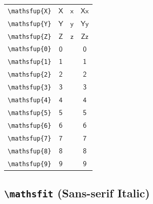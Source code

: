 \documentclass[12pt,a4paper]{article}
\begin{document}
\begin{longtable}{|c|c|c|c|}
\verb|\mathsfup{X}| & $\mathsfup{X}$ & $\mathsfup{x}$ & $ 𝖷 𝗑 $ \\
\verb|\mathsfup{Y}| & $\mathsfup{Y}$ & $\mathsfup{y}$ & $ 𝖸 𝗒 $ \\
\verb|\mathsfup{Z}| & $\mathsfup{Z}$ & $\mathsfup{z}$ & $ 𝖹 𝗓 $ \\
\verb|\mathsfup{0}| & $\mathsfup{0}$ & & $ 𝟢 $ \\
\verb|\mathsfup{1}| & $\mathsfup{1}$ & & $ 𝟣 $ \\
\verb|\mathsfup{2}| & $\mathsfup{2}$ & & $ 𝟤 $ \\
\verb|\mathsfup{3}| & $\mathsfup{3}$ & & $ 𝟥 $ \\
\verb|\mathsfup{4}| & $\mathsfup{4}$ & & $ 𝟦 $ \\
\verb|\mathsfup{5}| & $\mathsfup{5}$ & & $ 𝟧 $ \\
\verb|\mathsfup{6}| & $\mathsfup{6}$ & & $ 𝟨 $ \\
\verb|\mathsfup{7}| & $\mathsfup{7}$ & & $ 𝟩 $ \\
\verb|\mathsfup{8}| & $\mathsfup{8}$ & & $ 𝟪 $ \\
\verb|\mathsfup{9}| & $\mathsfup{9}$ & & $ 𝟫 $ \\
\hline
\end{longtable}

\newpage

\subsection*{\texttt{\textbackslash{}mathsfit} (Sans-serif Italic)}
\end{document}
